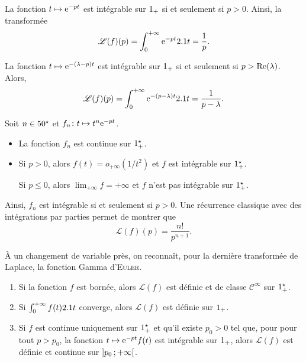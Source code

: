 \begin{solution}
\begin{reponses}
\item La fonction $t \mapsto \e^{-pt}$ est intégrable sur $\Rp$ si et seulement si $p > 0$. Ainsi, la transformée 
\[
\mathscr{L}(f)(p) = \int_0^{+\infty} \e^{-pt} \d t = \frac{1}{p}.
\]

\item La fonction $t \mapsto \e^{-(\lambda-p)t}$ est intégrable sur $\Rp$ si et seulement si $p > \Reel(\lambda)$. Alors,
\[
\mathscr{L}(f)(p)
= \int_0^{+\infty} \e^{-(p-\lambda)t} \d t
= \frac{1}{p-\lambda}.
\]

\item Soit $n \in \Ne$ et $\fonctionligne[f_n]{t}{t^n \e^{-pt}}$.
\begin{itemize}
\item La fonction $f_n$ est continue sur $\Rpe$.
\item Si $p > 0$, alors $f(t) = o_{+\infty}(1/t^2)$ et $f$ est intégrable sur $\Rpe$.

Si $p \leqslant 0$, alors $\lim_{+\infty} f = +\infty$ et $f$ n'est pas intégrable sur $\Rpe$.
\end{itemize}
Ainsi, $f_n$ est intégrable si et seulement si $p > 0$. Une récurrence classique avec des intégrations par parties permet de montrer que
\[
\mathscr{L}(f)(p) = \frac{n!}{p^{n+1}}.
\]
\end{reponses}
\end{solution}



\begin{remarque}
À un changement de variable près, on reconnaît, pour la dernière transformée de Laplace, la fonction Gamma d'\textsc{Euler}.
\end{remarque}


\begin{theo}
\begin{enumerate}
\item Si la fonction $f$ est bornée, alors $\mathscr{L}(f)$ est définie et de classe $\mathscr{C}^\infty$ sur $\Rpe$.

\item Si $\int_0^{+\infty} f(t) \d t$ converge, alors $\mathscr{L}(f)$ est définie sur $\Rp$.

\item Si $f$ est continue uniquement sur $\Rpe$ et qu'il existe $p_0 > 0$ tel que, pour pour tout $p > p_0$, la fonction $t \mapsto \e^{-p t} f(t)$ est intégrable sur $\Rp$, alors $\mathscr{L}(f)$ est définie et continue sur $\interoo{p_0}{+\infty}$.
\end{enumerate}
\end{theo}

